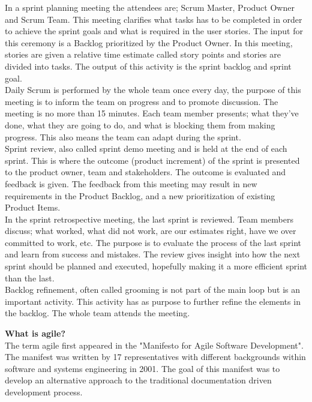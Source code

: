 In a sprint planning meeting the attendees are; Scrum Master, Product Owner and Scrum Team. This meeting clarifies what tasks has to be completed in order to achieve the sprint goals and what is required in 
the user stories. The input for this ceremony is a Backlog prioritized by the Product Owner. In this meeting, stories are given a relative time estimate called story points and stories are divided into tasks. The output of this activity is the sprint backlog and sprint goal.\\

Daily Scrum is performed by the whole team once every day, the purpose of this meeting is to inform the team on progress and to promote discussion. The meeting is no more than 15 minutes. Each team member presents; what they've done, what they are going to do, and what is blocking them from making progress. This also means the team can adapt during the sprint.\\

Sprint review, also called sprint demo meeting and is held at the end of each sprint. This is where the outcome (product increment) of the sprint is presented to the product owner, team and stakeholders. The outcome is evaluated and feedback is given. The feedback from this meeting may result in new requirements in the Product Backlog, and a new prioritization of existing Product Items.\\

In the sprint retrospective meeting, the last sprint is reviewed. Team members discuss; what worked, what did not work, are our estimates right, have we over committed to work, etc. The purpose is to evaluate the process of the last sprint and learn from success and mistakes. The review gives insight into how the next sprint should be planned and executed, hopefully making it a more efficient sprint than the last.\\

Backlog refinement, often called grooming is not part of the main loop but is an important activity. This activity has as purpose to further refine the elements in the backlog. The whole team attends the meeting.



\newpage
\textbf{\LARGE What is agile?} \\

The term agile first appeared in the "Manifesto for Agile Software Development"\cite{agileManifesto}. The manifest was written by 17 representatives with different backgrounds within software and systems engineering in 2001. The goal of this manifest was to develop an alternative approach to the traditional documentation driven development process.
\\

